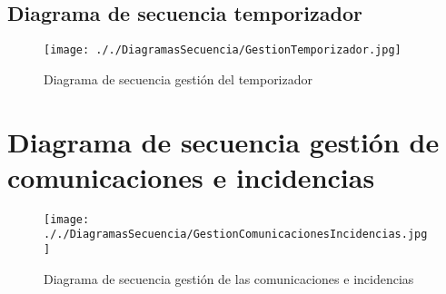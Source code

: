 \documentclass[11pt,spanish]{article} %
\begin{document}
\subsection{Diagrama de secuencia temporizador}
\begin{figure}[H]
	\centering
	\label{GestionTemporizador}
	\texttt{[image: ././DiagramasSecuencia/GestionTemporizador.jpg]}
	\caption{Diagrama de secuencia gestión del temporizador}
\end{figure}

\section{Diagrama de secuencia gestión de comunicaciones e incidencias}
\begin{figure}[H]
	\centering
	\label{GestionComunicacionesIncidencias}
	\texttt{[image: ././DiagramasSecuencia/GestionComunicacionesIncidencias.jpg]}
	\caption{Diagrama de secuencia gestión de las comunicaciones e incidencias}
\end{figure}
\end{document}
